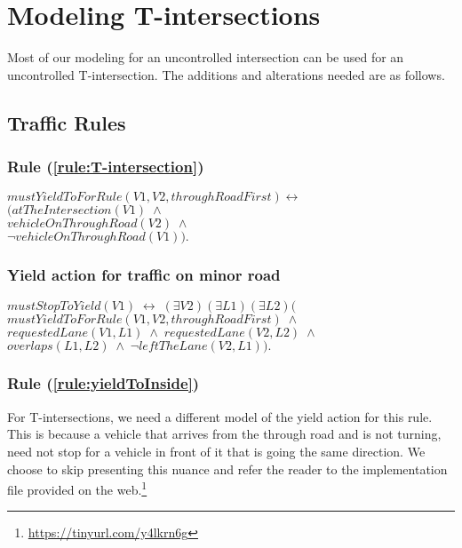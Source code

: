 \section{Modeling T-intersections}
\label{sec:modeling_T-intersection}

Most of our modeling for an uncontrolled intersection
can be used for an uncontrolled T-intersection.
The additions and alterations needed are as follows.

\subsection{Traffic Rules}

\subsubsection{Rule (\ref{rule:T-intersection})}
\begin{center}
    $ mustYieldToForRule(V1, V2, throughRoadFirst) \leftrightarrow $ \\
    $ \Big( atTheIntersection(V1) \; \land $\\
    $ vehicleOnThroughRoad(V2) \; \land $\\
    $ \neg vehicleOnThroughRoad(V1) \Big). $
\end{center}

\subsubsection{Yield action for traffic on minor road}
\begin{center}
    $ mustStopToYield(V1) \; \leftrightarrow \; (\exists V2)(\exists L1)(\exists L2) \Big( $ \\
    $ mustYieldToForRule(V1, V2, throughRoadFirst) \; \land $\\
    $ requestedLane(V1, L1) \; \land \; requestedLane(V2, L2) \; \land $\\
    $ overlaps(L1, L2) \; \land \; \neg leftTheLane(V2, L1) \Big). $
\end{center}

\subsubsection{Rule (\ref{rule:yieldToInside})}
For T-intersections,
we need a different model of the yield action for this rule.
This is because a vehicle that arrives from the through road
and is not turning,
need not stop for a vehicle in front of it that is 
going the same direction.
We choose to skip presenting this nuance and
refer the reader to the implementation file
provided on the web.\footnote{\label{foot:link}\url{https://tinyurl.com/y4lkrn6g}}

